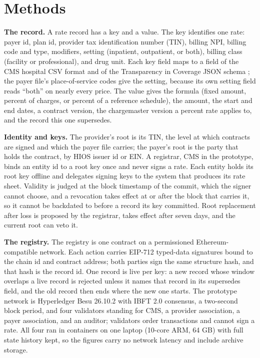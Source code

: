 \documentclass{IOS-Book-Article}
\begin{document}
\section{Methods}

\textbf{The record.} A rate record has a key and a value. The key identifies one rate: payer id, plan id, provider tax identification number (TIN), billing NPI, billing code and type, modifiers, setting (inpatient, outpatient, or both), billing class (facility or professional), and drug unit. Each key field maps to a field of the CMS hospital CSV format and of the Transparency in Coverage JSON schema \cite{schemas}; the payer file's place-of-service codes give the setting, because its own setting field reads ``both'' on nearly every price. The value gives the formula (fixed amount, percent of charges, or percent of a reference schedule), the amount, the start and end dates, a contract version, the chargemaster version a percent rate applies to, and the record this one supersedes.

\textbf{Identity and keys.} The provider's root is its TIN, the level at which contracts are signed and which the payer file carries; the payer's root is the party that holds the contract, by HIOS issuer id or EIN. A registrar, CMS in the prototype, binds an entity id to a root key once and never signs a rate. Each entity holds its root key offline and delegates signing keys to the system that produces its rate sheet. Validity is judged at the block timestamp of the commit, which the signer cannot choose, and a revocation takes effect at or after the block that carries it, so it cannot be backdated to before a record its key committed. Root replacement after loss is proposed by the registrar, takes effect after seven days, and the current root can veto it.

\textbf{The registry.} The registry is one contract on a permissioned Ethereum-compatible network. Each action carries EIP-712 typed-data signatures bound to the chain id and contract address; both parties sign the same structure hash, and that hash is the record id. One record is live per key: a new record whose window overlaps a live record is rejected unless it names that record in its supersedes field, and the old record then ends where the new one starts. The prototype network is Hyperledger Besu 26.10.2 with IBFT 2.0 consensus, a two-second block period, and four validators standing for CMS, a provider association, a payer association, and an auditor; validators order transactions and cannot sign a rate. All four ran in containers on one laptop (10-core ARM, 64 GB) with full state history kept, so the figures carry no network latency and include archive storage.
\end{document}
